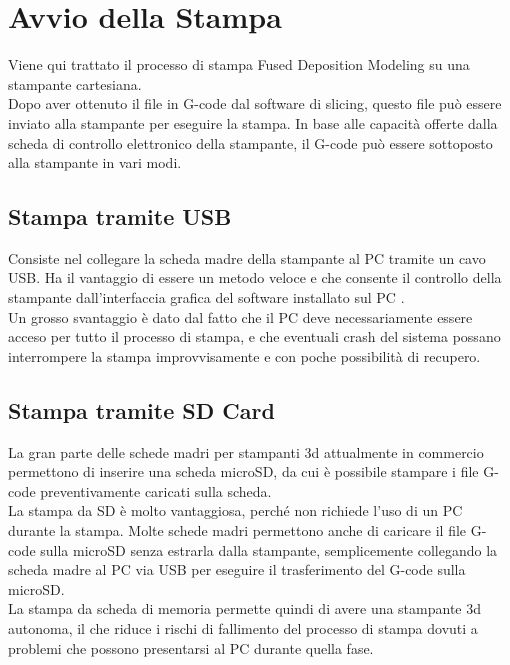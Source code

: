 \section{Avvio della Stampa}
Viene qui trattato il processo di stampa Fused Deposition Modeling su una stampante cartesiana.\\
Dopo aver ottenuto il file in G-code dal software di slicing, questo file può essere inviato alla stampante per eseguire la stampa. In base alle capacità offerte dalla scheda di controllo elettronico della stampante, il G-code può essere sottoposto alla stampante in vari modi.


\subsection{Stampa tramite USB} 
Consiste nel collegare la scheda madre della stampante al PC tramite un cavo USB.
Ha il vantaggio di essere un metodo veloce e che consente il controllo della stampante dall'interfaccia grafica del software installato sul PC \parencite{Reference2}.\\
Un grosso svantaggio è dato dal fatto che il PC deve necessariamente essere acceso per tutto il processo di stampa, e che eventuali crash del sistema possano interrompere la stampa improvvisamente e con poche possibilità di recupero.

\subsection{Stampa tramite SD Card}
La gran parte delle schede madri per stampanti 3d attualmente in commercio permettono di inserire una scheda microSD, da cui è possibile stampare i file G-code preventivamente caricati sulla scheda.\\
La stampa da SD è molto vantaggiosa, perché non richiede l'uso di un PC durante la stampa.
Molte schede madri permettono anche di caricare il file G-code sulla microSD senza estrarla dalla stampante, semplicemente collegando la scheda madre al PC via USB per eseguire il trasferimento del G-code sulla microSD.\\
La stampa da scheda di memoria permette quindi di avere una stampante 3d autonoma, il che riduce i rischi di fallimento del processo di stampa dovuti a problemi che possono presentarsi al PC durante quella fase.

